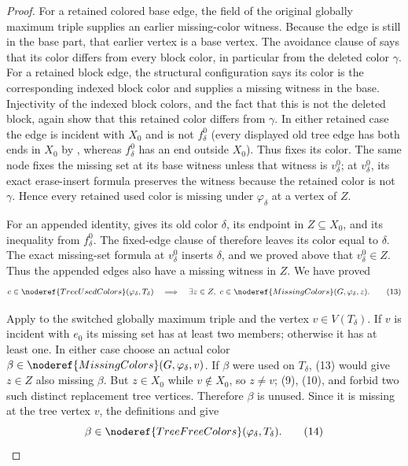 \begin{proof}
For a retained colored base edge, the
 field of the original globally maximum triple
supplies an earlier missing-color witness.  Because the edge is still in
the base part, that earlier vertex is a base vertex.  The avoidance clause
of  says that its color differs
from every block color, in particular from the deleted color $\gamma$.
For a retained block edge, the structural configuration says its color is
the corresponding indexed block color and supplies a missing witness in
the base.  Injectivity of the indexed block colors, and the fact that this
is not the deleted block, again show that this retained color differs from
$\gamma$.  In either retained case the edge is incident with $X_0$ and is
not $f^0_\delta$ (every displayed old tree edge has both ends in $X_0$ by
, whereas $f^0_\delta$ has an end outside $X_0$).
Thus  fixes its color.  The same
node fixes the missing set at its base witness unless that witness is
$v^0_\delta$; at $v^0_\delta$, its exact erase-insert formula preserves
the witness because the retained color is not $\gamma$.  Hence every
retained used color is missing under $\varphi_\delta$ at a vertex of $Z$.

For an appended identity,  gives its old
color $\delta$, its endpoint in $Z\subseteq X_0$, and its inequality from
$f^0_\delta$.  The fixed-edge clause of
 therefore leaves its color equal
to $\delta$.  The exact missing-set formula at $v^0_\delta$ inserts
$\delta$, and we proved above that $v^0_\delta\in Z$.  Thus the appended
edges also have a missing witness in $Z$.  We have proved
\[
 c\in\noderef{TreeUsedColors}(\varphi_\delta,T_\delta)
 \quad\Longrightarrow\quad
 \exists z\in Z,\ c\in\noderef{MissingColors}(G,\varphi_\delta,z).
                                                                    \tag{13}
\]

Apply  to the switched globally
maximum triple and the vertex $v\in V(T_\delta)$.  If $v$ is incident
with $e_0$ its missing set has at least two members; otherwise it has at
least one.  In either case choose an actual color
$\beta\in\noderef{MissingColors}(G,\varphi_\delta,v)$.  If $\beta$ were
used on $T_\delta$, (13) would give $z\in Z$ also missing $\beta$.  But
$z\in X_0$ while $v\notin X_0$, so $z\ne v$; (9), (10), and
 forbid two such distinct replacement
tree vertices.  Therefore $\beta$ is unused.  Since it is missing at the
tree vertex $v$, the definitions  and
 give
\[
 \beta\in\noderef{TreeFreeColors}(\varphi_\delta,T_\delta).  \tag{14}
\]


\end{proof}
